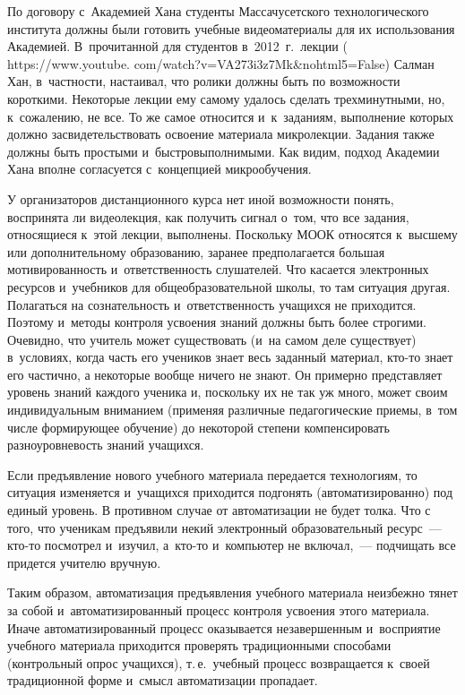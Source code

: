 \begin{multicols}{2}
  По договору с~Академией Хана студенты Массачусетского технологического 
института должны были готовить учебные видеоматериалы для их 
использования Академией. В~прочитанной для студентов в~2012~г.\ лекции ({\sf 
https://www.youtube. com/watch?v=VA273i3z7Mk\&nohtml5=False}) Салман Хан, 
в~частности, настаивал, что ролики должны быть по возможности короткими. 
Некоторые лекции ему самому удалось сделать трехминутными, но, 
к~сожалению, не все. То же самое относится и~к~заданиям, выполнение 
которых должно засвидетельствовать освоение материала микролекции. 
Задания также должны быть прос\-ты\-ми и~быстровыполнимыми. Как видим, 
подход Академии Хана вполне согласуется с~концепцией микрообучения.
  
  У организаторов дистанционного курса нет иной возможности понять, 
воспринята ли видеолекция, как получить сигнал о~том, что все задания, 
относящиеся к~этой лекции, выполнены. Поскольку МООК относятся 
к~высшему или дополнительному образованию, заранее предполагается 
большая мотивированность и~ответственность слушателей. Что касается 
электронных ресурсов и~учебников для общеобразовательной школы, то там 
ситуация другая. Полагаться на сознательность и~ответственность учащихся не 
приходится. Поэтому и~методы контроля усвоения знаний должны быть более 
строгими. Очевидно, что учитель может существовать (и~на самом деле 
существует) в~условиях, когда часть его учеников знает весь заданный 
материал, кто-то знает его частично, а некоторые вообще ничего не знают. Он 
примерно представляет уровень знаний каждого ученика и, поскольку их не так 
уж много, может своим индивидуальным вниманием (применяя различные 
педагогические приемы, в~том числе формирующее обучение) до некоторой 
степени компенсировать разноуровневость знаний учащихся.
  
  Если предъявление нового учебного материала передается технологиям, то 
ситуация изменяется и~учащихся приходится подгонять (автоматизированно) 
под единый уровень. В противном случае от автоматизации не будет толка. Что 
с того, что ученикам предъявили некий электронный образовательный  
ресурс~--- кто-то посмотрел и~изучил, а~кто-то и~компьютер не включал,~--- 
подчищать все придется учителю вручную.
  
  Таким образом, автоматизация предъявления учебного материала неизбежно 
тянет за собой и~автоматизированный процесс контроля усвоения этого 
материала. Иначе автоматизированный процесс оказывается незавершенным 
и~восприятие учебного материала приходится проверять традиционными 
способами (контрольный опрос учащихся), т.\,е.\ учебный процесс 
возвращается к~своей традиционной форме и~смысл автоматизации пропадает.
  

\end{multicols}
